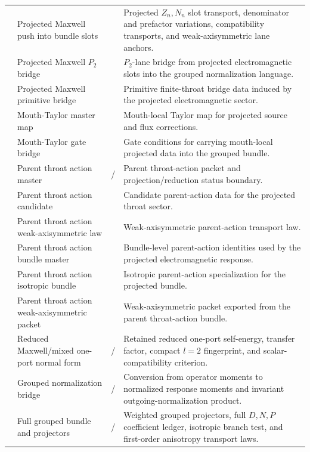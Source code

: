\begin{longtable}{@{}L{0.10\textwidth}L{0.27\textwidth}L{0.22\textwidth}L{0.34\textwidth}@{}}
 & Projected Maxwell push into bundle slots & \StatusExactClosure{} & Projected \(Z_n,N_n\) slot transport, denominator and prefactor variations, compatibility transports, and weak-axisymmetric lane anchors. \\
 & Projected Maxwell \(P_2\) bridge & \StatusExactClosure{} & \(P_2\)-lane bridge from projected electromagnetic slots into the grouped normalization language. \\
 & Projected Maxwell primitive bridge & \StatusExactClosure{} & Primitive finite-throat bridge data induced by the projected electromagnetic sector. \\
 & Mouth-Taylor master map & \StatusExactClosure{} & Mouth-local Taylor map for projected source and flux corrections. \\
 & Mouth-Taylor gate bridge & \StatusExactClosure{} & Gate conditions for carrying mouth-local projected data into the grouped bundle. \\
 & Parent throat action master & \StatusExact{} / \StatusReduced{} & Parent throat-action packet and projection/reduction status boundary. \\
 & Parent throat action candidate & \StatusExactClosure{} & Candidate parent-action data for the projected throat sector. \\
 & Parent throat action weak-axisymmetric law & \StatusExactClosure{} & Weak-axisymmetric parent-action transport law. \\
 & Parent throat action bundle master & \StatusExactClosure{} & Bundle-level parent-action identities used by the projected electromagnetic response. \\
 & Parent throat action isotropic bundle & \StatusExactClosure{} & Isotropic parent-action specialization for the projected bundle. \\
 & Parent throat action weak-axisymmetric packet & \StatusExactClosure{} & Weak-axisymmetric packet exported from the parent throat-action bundle. \\
 & Reduced Maxwell/mixed one-port normal form & \StatusReduced{} / \StatusExactClosure{} & Retained reduced one-port self-energy, transfer factor, compact \(l=2\) fingerprint, and scalar-compatibility criterion. \\
 & Grouped normalization bridge & \StatusExactClosure{} / \StatusOpen{} & Conversion from operator moments to normalized response moments and invariant outgoing-normalization product. \\
 & Full grouped bundle and projectors & \StatusExactClosure{} / \StatusOpen{} & Weighted grouped projectors, full \(D,N,P\) coefficient ledger, isotropic branch test, and first-order anisotropy transport laws. \\
\bottomrule
\end{longtable}

